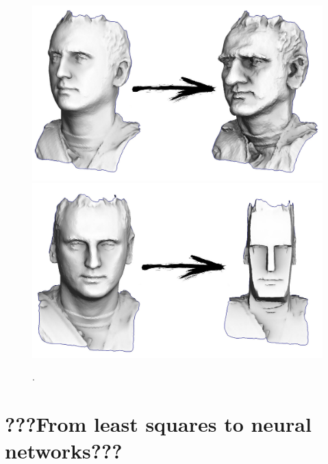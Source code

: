 \documentclass[notitlepage]{report}
\begin{document}
\begin{figure}[ht]
	\centering
    \includegraphics[width=.8\linewidth]{caricature.jpg}
	\includegraphics[width=.8\linewidth]{cubify.jpg}
	\caption{.}
	\label{fig:????}
\end{figure}


\chapter{???From least squares to neural networks???}
\end{document}

